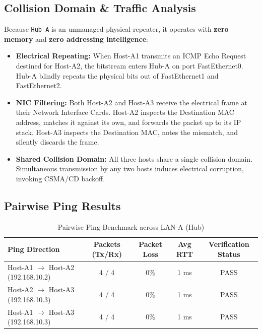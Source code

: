 \documentclass[12pt, a4paper]{article}
\begin{document}
\subsection{Collision Domain \& Traffic Analysis}
Because \texttt{Hub-A} is an unmanaged physical repeater, it operates with \textbf{zero memory} and \textbf{zero addressing intelligence}:
\begin{itemize}
    \item \textbf{Electrical Repeating:} When Host-A1 transmits an ICMP Echo Request destined for Host-A2, the bitstream enters Hub-A on port FastEthernet0. Hub-A blindly repeats the physical bits out of FastEthernet1 and FastEthernet2.
    \item \textbf{NIC Filtering:} Both Host-A2 and Host-A3 receive the electrical frame at their Network Interface Cards. Host-A2 inspects the Destination MAC address, matches it against its own, and forwards the packet up to its IP stack. Host-A3 inspects the Destination MAC, notes the mismatch, and silently discards the frame.
    \item \textbf{Shared Collision Domain:} All three hosts share a single collision domain. Simultaneous transmission by any two hosts induces electrical corruption, invoking CSMA/CD backoff.
\end{itemize}

\subsection{Pairwise Ping Results}
\begin{table}[H]
\centering
\caption{Pairwise Ping Benchmark across LAN-A (Hub)}
\label{tab:prob2_ping}
\begin{tabular}{lcccc}
\toprule
\textbf{Ping Direction} & \textbf{Packets (Tx/Rx)} & \textbf{Packet Loss} & \textbf{Avg RTT} & \textbf{Verification Status} \\
\midrule
Host-A1 $\rightarrow$ Host-A2 (192.168.10.2) & 4 / 4 & 0\% & 1 ms & PASS \\
Host-A2 $\rightarrow$ Host-A3 (192.168.10.3) & 4 / 4 & 0\% & 1 ms & PASS \\
Host-A1 $\rightarrow$ Host-A3 (192.168.10.3) & 4 / 4 & 0\% & 1 ms & PASS \\
\bottomrule
\end{tabular}
\end{table}

\end{document}
